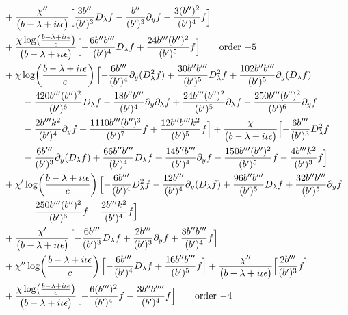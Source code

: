 \documentclass[reqno,11pt]{amsart}
\numberwithin{equation}{section}
\newcommand{\p}{\partial}
\newcommand{\D}{D_\lambda}
\numberwithin{equation}{section} %
\begin{document}
\begin{enumerate}
\begin{align}
&+\frac{\chi''}{\bigl(b -\lambda+i\iota\epsilon\bigr)}\Bigl[\frac{3 b'' }{(b' )^{3}} \D f- \frac{b'' }{(b' )^{3}} \p_y f- \frac{3 (b'' )^{2}}{(b' )^{4}} f\Bigr]\notag\\
&+\frac{\chi\log\!\left(\frac{b -\lambda+i\iota\epsilon}{c}\right)}{\bigl(b -\lambda+i\iota\epsilon\bigr)}\Bigl[- \frac{6 b''  b''' }{(b' )^{4}} \D f+\frac{24 b'''  (b'' )^{2}}{(b' )^{5}} f\Bigr]\tag*{\text{order $-5$}}\notag\\
&+\chi\log\!\left(\frac{b -\lambda+i\iota\epsilon}{c}\right)\Bigl[- \frac{6 b''' }{(b' )^{4}} \p_y(\D^2 f)+\frac{30 b''  b''' }{(b' )^{5}} \D^2 f+\frac{102 b''  b''' }{(b' )^{5}} \p_y(\D f)\notag\\
&\qquad - \frac{420 b'''  (b'' )^{2}}{(b' )^{6}} \D f- \frac{18 b''  b''' }{(b' )^{4}} \p_y\p_\lambda f+\frac{24 b'''  (b'' )^{2}}{(b' )^{5}} \p_\lambda f- \frac{250 b'''  (b'' )^{2}}{(b' )^{6}} \p_y f\notag\\
&\qquad - \frac{2 b'''  k^2}{(b' )^{4}} \p_y f+\frac{1110 b'''  (b'' )^{3}}{(b' )^{7}} f+\frac{12 b''  b'''  k^2}{(b' )^{5}} f\Bigr]+\frac{\chi}{\bigl(b -\lambda+i\iota\epsilon\bigr)}\Bigl[- \frac{6 b''' }{(b' )^{3}} \D^2 f\notag\\
&\qquad - \frac{6 b''' }{(b' )^{3}} \p_y(\D f)+\frac{66 b''  b''' }{(b' )^{4}} \D f+\frac{14 b''  b''' }{(b' )^{4}} \p_y f- \frac{150 b'''  (b'' )^{2}}{(b' )^{5}} f- \frac{4 b'''  k^2}{(b' )^{3}} f\Bigr]\notag\\
&+\chi'\log\!\left(\frac{b -\lambda+i\iota\epsilon}{c}\right)\Bigl[- \frac{6 b''' }{(b' )^{4}} \D^2 f- \frac{12 b''' }{(b' )^{4}} \p_y(\D f)+\frac{96 b''  b''' }{(b' )^{5}} \D f+\frac{32 b''  b''' }{(b' )^{5}} \p_y f\notag\\
&\qquad - \frac{250 b'''  (b'' )^{2}}{(b' )^{6}} f- \frac{2 b'''  k^2}{(b' )^{4}} f\Bigr]\notag\\
&+\frac{\chi'}{\bigl(b -\lambda+i\iota\epsilon\bigr)}\Bigl[- \frac{6 b''' }{(b' )^{3}} \D f+\frac{2 b''' }{(b' )^{3}} \p_y f+\frac{8 b''  b''' }{(b' )^{4}} f\Bigr]\notag\\
&+\chi''\log\!\left(\frac{b -\lambda+i\iota\epsilon}{c}\right)\Bigl[- \frac{6 b''' }{(b' )^{4}} \D f+\frac{16 b''  b''' }{(b' )^{5}} f\Bigr]+\frac{\chi''}{\bigl(b -\lambda+i\iota\epsilon\bigr)}\Bigl[\frac{2 b''' }{(b' )^{3}} f\Bigr]\notag\\
&+\frac{\chi\log\!\left(\frac{b -\lambda+i\iota\epsilon}{c}\right)}{\bigl(b -\lambda+i\iota\epsilon\bigr)}\Bigl[- \frac{6 (b''' )^{2}}{(b' )^{4}} f- \frac{3 b''  b'''' }{(b' )^{4}} f\Bigr]\tag*{\text{order $-4$}}\\

\end{align}
\end{enumerate}
\end{document}
